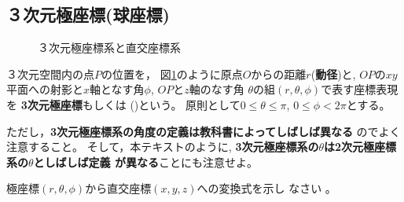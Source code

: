 \documentclass[twocolumn,11pt]{jarticle}
\begin{document}

\subsection{３次元極座標(球座標)}

\begin{figure}[h]
  \begin{center}
    \caption{３次元極座標系と直交座標系}
    \label{fig:polar-coord}
  \end{center}
\end{figure}
３次元空間内の点$P$の位置を，
図\ref{fig:polar-coord}のように原点$O$からの距離$r$(\textbf{動径})と, 
$OP$の$xy$平面への射影と$x$軸となす角$\phi$, $OP$と$z$軸のなす角
$\theta$の組$(r, \theta, \phi)$で表す座標表現を
\textbf{3次元極座標}もしくは
()という。
原則として$0\le\theta\le\pi$, $0\le\phi<2\pi$とする。

ただし，\textbf{3次元極座標系の角度の定義は教科書によってしばしば異なる}
  のでよく注意すること。
そして，本テキストのように, 
\textbf{3次元極座標系の$\theta$は2次元極座標系の$\theta$としばしば定義
  が異なる}ことにも注意せよ。

\question
 極座標$(r, \theta, \phi)$から直交座標$(x, y, z)$への変換式を示し
  なさい
  。
\end{document}
